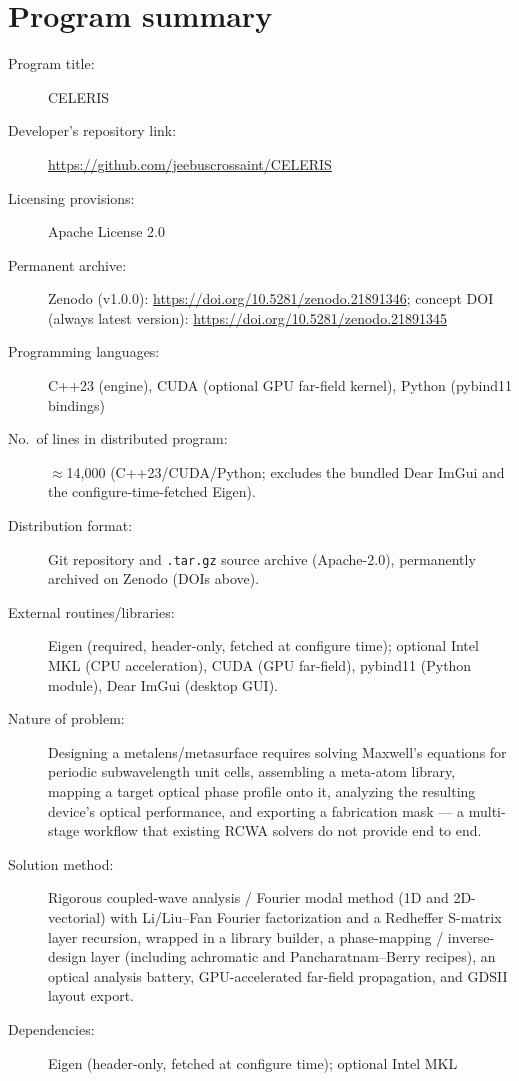 \documentclass[preprint,12pt]{elsarticle}
\begin{document}
\section*{Program summary}
\begin{description}
\item[Program title:] CELERIS
\item[Developer's repository link:] \url{https://github.com/jeebuscrossaint/CELERIS}
\item[Licensing provisions:] Apache License 2.0
\item[Permanent archive:] Zenodo (v1.0.0): \url{https://doi.org/10.5281/zenodo.21891346};
      concept DOI (always latest version): \url{https://doi.org/10.5281/zenodo.21891345}
\item[Programming languages:] C++23 (engine), CUDA (optional GPU far-field kernel),
      Python (pybind11 bindings)
\item[No.\ of lines in distributed program:] $\approx$14{,}000 (C++23/CUDA/Python;
      excludes the bundled Dear ImGui and the configure-time-fetched Eigen).
\item[Distribution format:] Git repository and \texttt{.tar.gz} source archive
      (Apache-2.0), permanently archived on Zenodo (DOIs above).
\item[External routines/libraries:] Eigen (required, header-only, fetched at configure
      time); optional Intel MKL (CPU acceleration), CUDA (GPU far-field), pybind11
      (Python module), Dear ImGui (desktop GUI).
\item[Nature of problem:] Designing a metalens/metasurface requires solving Maxwell's
      equations for periodic subwavelength unit cells, assembling a meta-atom library,
      mapping a target optical phase profile onto it, analyzing the resulting device's
      optical performance, and exporting a fabrication mask --- a multi-stage workflow
      that existing RCWA solvers do not provide end to end.
\item[Solution method:] Rigorous coupled-wave analysis / Fourier modal method (1D and
      2D-vectorial) with Li/Liu--Fan Fourier factorization and a Redheffer S-matrix
      layer recursion, wrapped in a library builder, a phase-mapping / inverse-design
      layer (including achromatic and Pancharatnam--Berry recipes), an optical analysis
      battery, GPU-accelerated far-field propagation, and GDSII layout export.
\item[Dependencies:] Eigen (header-only, fetched at configure time); optional Intel MKL

\end{description}
\end{document}
